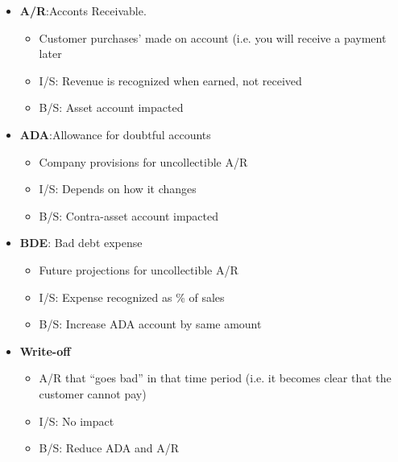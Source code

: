\begin{itemize}
	\item \textbf{A/R}:Acconts Receivable.
	\begin{itemize}
		\item Customer purchases' made on account (i.e. you will receive a payment later
		\item I/S: Revenue is recognized when earned, not received
		\item B/S: Asset account impacted 
	\end{itemize}
	\item \textbf{ADA}:Allowance for doubtful accounts 
	\begin{itemize}
		\item Company provisions for uncollectible A/R
		\item I/S: Depends on how it changes
		\item B/S: Contra-asset account impacted
	\end{itemize}
	\item \textbf{BDE}: Bad debt expense
	\begin{itemize}
		\item Future projections for uncollectible A/R
		\item I/S: Expense recognized as \% of sales
		\item B/S: Increase ADA account by same amount
	\end{itemize}
	\item \textbf{Write-off}
	\begin{itemize}
		\item A/R that “goes bad” in that time period (i.e. it becomes clear that the customer cannot pay)
		\item  I/S: No impact
		\item  B/S: Reduce ADA and A/R
	\end{itemize}
	
\end{itemize}

